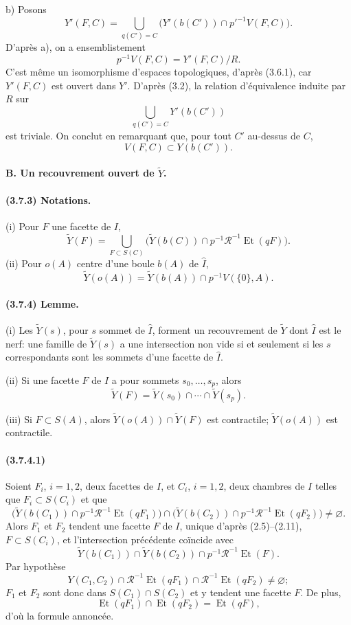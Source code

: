 \documentclass[10pt]{article}
\begin{document}
b) Posons
\[
Y'(F,C)=
\bigcup_{q(C')=C}
\bigl(Y'(b(C'))\cap p'^{-1}V(F,C)\bigr).
\]
D'après a), on a ensemblistement
\[
p^{-1}V(F,C)=Y'(F,C)/R.
\]
C'est même un isomorphisme d'espaces topologiques, d'après (3.6.1), car \(Y'(F,C)\) est ouvert dans \(Y'\). D'après (3.2), la relation d'équivalence induite par \(R\) sur
\[
\bigcup_{q(C')=C}Y'(b(C'))
\]
est triviale. On conclut en remarquant que, pour tout \(C'\) au-dessus de \(C\),
\[
V(F,C)\subset Y(b(C')).
\]

\paragraph{B. Un recouvrement ouvert de \(\widetilde Y\).}

\paragraph{(3.7.3) Notations.} (i) Pour \(F\) une facette de \(I\),
\[
\widetilde Y(F)=
\bigcup_{F\subset S(C)}
\bigl(\widetilde Y(b(C))\cap p^{-1}\mathcal R^{-1}\operatorname{Et}(qF)\bigr).
\]
(ii) Pour \(o(A)\) centre d'une boule \(b(A)\) de \(\widehat I\),
\[
\widetilde Y(o(A))=\widetilde Y(b(A))\cap p^{-1}V(\{0\},A).
\]

\paragraph{(3.7.4) Lemme.} (i) Les \(\widetilde Y(s)\), pour \(s\) sommet de \(\widehat I\), forment un recouvrement de \(\widetilde Y\) dont \(\widehat I\) est le nerf: une famille de \(\widetilde Y(s)\) a une intersection non vide si et seulement si les \(s\) correspondants sont les sommets d'une facette de \(\widehat I\).

(ii) Si une facette \(F\) de \(I\) a pour sommets \(s_0,\ldots,s_p\), alors
\[
\widetilde Y(F)=\widetilde Y(s_0)\cap\cdots\cap\widetilde Y(s_p).
\]

(iii) Si \(F\subset S(A)\), alors \(\widetilde Y(o(A))\cap\widetilde Y(F)\) est contractile; \(\widetilde Y(o(A))\) est contractile.

\paragraph{(3.7.4.1)} Soient \(F_i\), \(i=1,2\), deux facettes de \(I\), et \(C_i\), \(i=1,2\), deux chambres de \(I\) telles que \(F_i\subset S(C_i)\) et que
\[
\bigl(\widetilde Y(b(C_1))\cap p^{-1}\mathcal R^{-1}\operatorname{Et}(qF_1)\bigr)
\cap
\bigl(\widetilde Y(b(C_2))\cap p^{-1}\mathcal R^{-1}\operatorname{Et}(qF_2)\bigr)
\ne\varnothing.
\]
Alors \(F_1\) et \(F_2\) tendent une facette \(F\) de \(I\), unique d'après (2.5)--(2.11), \(F\subset S(C_i)\), et l'intersection précédente coïncide avec
\[
\widetilde Y(b(C_1))\cap \widetilde Y(b(C_2))
\cap p^{-1}\mathcal R^{-1}\operatorname{Et}(F).
\]
Par hypothèse
\[
Y(C_1,C_2)\cap\mathcal R^{-1}\operatorname{Et}(qF_1)\cap
\mathcal R^{-1}\operatorname{Et}(qF_2)\ne\varnothing;
\]
\(F_1\) et \(F_2\) sont donc dans \(S(C_1)\cap S(C_2)\) et y tendent une facette \(F\). De plus,
\[
\operatorname{Et}(qF_1)\cap\operatorname{Et}(qF_2)=\operatorname{Et}(qF),
\]
d'où la formule annoncée.
\end{document}
